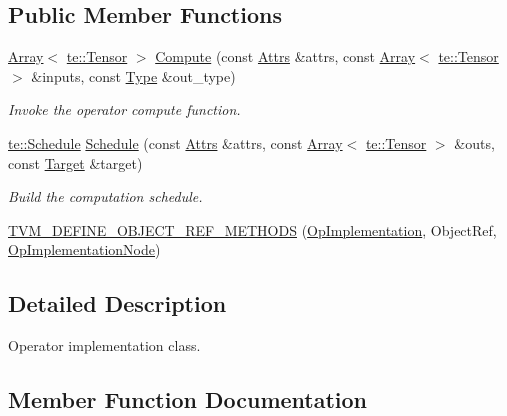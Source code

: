 \subsection*{Public Member Functions}
\begin{DoxyCompactItemize}
\item 
\hyperlink{classtvm_1_1Array}{Array}$<$ \hyperlink{classtvm_1_1te_1_1Tensor}{te\+::\+Tensor} $>$ \hyperlink{classtvm_1_1relay_1_1OpImplementation_a04d79f30d070ca87272c439dc7ed2d52}{Compute} (const \hyperlink{classtvm_1_1Attrs}{Attrs} \&attrs, const \hyperlink{classtvm_1_1Array}{Array}$<$ \hyperlink{classtvm_1_1te_1_1Tensor}{te\+::\+Tensor} $>$ \&inputs, const \hyperlink{namespacetvm_1_1relay_a661d95f170bca230773914caeef3fe52}{Type} \&out\+\_\+type)
\begin{DoxyCompactList}\small\item\em Invoke the operator compute function. \end{DoxyCompactList}\item 
\hyperlink{classtvm_1_1te_1_1Schedule}{te\+::\+Schedule} \hyperlink{classtvm_1_1relay_1_1OpImplementation_a13a90107dc66983c53faf1620b022d28}{Schedule} (const \hyperlink{classtvm_1_1Attrs}{Attrs} \&attrs, const \hyperlink{classtvm_1_1Array}{Array}$<$ \hyperlink{classtvm_1_1te_1_1Tensor}{te\+::\+Tensor} $>$ \&outs, const \hyperlink{classtvm_1_1Target}{Target} \&target)
\begin{DoxyCompactList}\small\item\em Build the computation schedule. \end{DoxyCompactList}\item 
\hyperlink{classtvm_1_1relay_1_1OpImplementation_ae5236bb7515bb15a490c6631528034ab}{T\+V\+M\+\_\+\+D\+E\+F\+I\+N\+E\+\_\+\+O\+B\+J\+E\+C\+T\+\_\+\+R\+E\+F\+\_\+\+M\+E\+T\+H\+O\+DS} (\hyperlink{classtvm_1_1relay_1_1OpImplementation}{Op\+Implementation}, Object\+Ref, \hyperlink{classtvm_1_1relay_1_1OpImplementationNode}{Op\+Implementation\+Node})
\end{DoxyCompactItemize}


\subsection{Detailed Description}
Operator implementation class. 

\subsection{Member Function Documentation}
